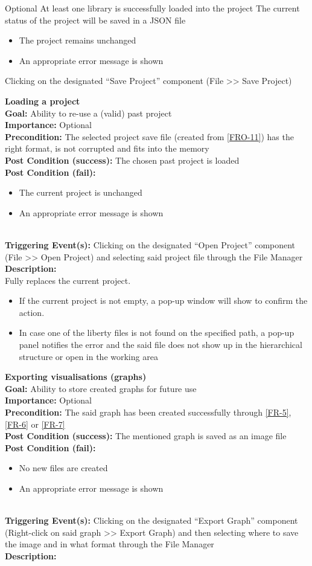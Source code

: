 \documentclass[10pt,a4paper]{report}
\newcommand{\precondition}[1]{
    \textbf{Precondition: } #1 \leavevmode \\
}
\newcommand{\FRODescription}[8]{
    \textbf{#1} \leavevmode \\
    \textbf{Goal: } #2 \leavevmode \\
    \textbf{Importance: } #3 \leavevmode \\
    \precondition{#4}
    \textbf{Post Condition (success): } #5 \leavevmode \\
    \textbf{Post Condition (fail): } #6 \leavevmode \\
    \textbf{Triggering Event(s): } #7 \leavevmode \\
    \textbf{Description: } \leavevmode \\
    #8}
\begin{document}
\begin{FRO}
    {Optional}
    {At least one library is successfully loaded into the project}
    {The current status of the project will be saved in a JSON file}
    {\begin{itemize}
        \item The project remains unchanged
        \item An appropriate error message is shown
    \end{itemize}}
    {Clicking on the designated “Save Project” component (File >> Save Project)}
    \item \FRODescription{Loading a project}
    {Ability to re-use a (valid) past project}
    {Optional}
    {The selected project save file (created from \ref{FRO-11}) has the right format, is not corrupted and fits into the memory}
    {The chosen past project is loaded}
    {\begin{itemize}
        \item The current project is unchanged
        \item An appropriate error message is shown
    \end{itemize}}
    {Clicking on the designated “Open Project” component (File >> Open Project) and selecting said project file through the File Manager}
    {Fully replaces the current project. 
    \begin{itemize}
    \item If the current project is not empty, a pop-up window will show to confirm the action. 
    \item In case one of the liberty files is not found on the specified path, a pop-up panel notifies the error and the said file does not show up in the hierarchical structure or open in the working area
    \end{itemize}}
    \item \FRODescription{Exporting visualisations (graphs)}
    {Ability to store created graphs for future use}
    {Optional}
    {The said graph has been created successfully through \ref{FR-5}, \ref{FR-6} or \ref{FR-7}}
    {The mentioned graph is saved as an image file}
    {\begin{itemize}
        \item No new files are created
        \item An appropriate error message is shown
    \end{itemize}}
    {Clicking on the designated “Export Graph” component (Right-click on said graph >> Export Graph) and then selecting where to save the image and in what format through the File Manager}

\end{FRO}
\end{document}
